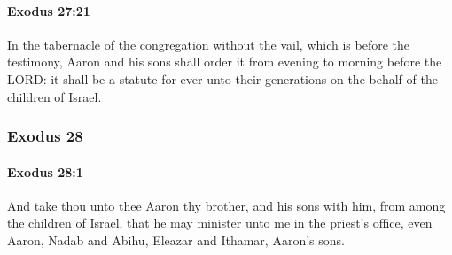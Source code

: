 		\paragraph{Exodus 27:21} %
			\label{EXODUS-27-21}

			In the tabernacle of the congregation without the vail, which is before the testimony, Aaron and his sons shall order it from evening to morning before the LORD: it shall be a statute for ever unto their generations on the behalf of the children of Israel.

	\subsubsection{Exodus 28} %
		\label{EXODUS-28}

		\paragraph{Exodus 28:1} %
			\label{EXODUS-28-1}

			And take thou unto thee Aaron thy brother, and his sons with him, from among the children of Israel, that he may minister unto me in the priest's office, even Aaron, Nadab and Abihu, Eleazar and Ithamar, Aaron's sons.


